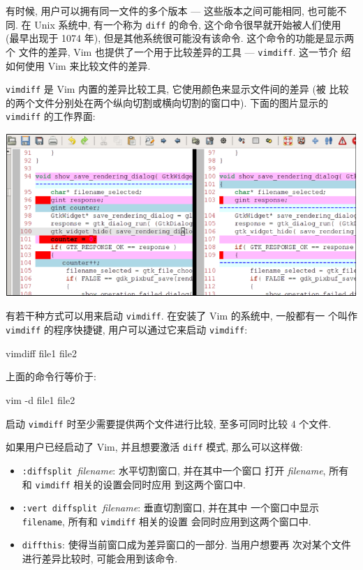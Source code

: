 有时候, 用户可以拥有同一文件的多个版本 --- 这些版本之间可能相同, 也可能不同.
在 Unix 系统中, 有一个称为 \texttt{diff} 的命令, 这个命令很早就开始被人们使用
(最早出现于 1074 年), 但是其他系统很可能没有该命令. 这个命令的功能是显示两个
文件的差异, Vim 也提供了一个用于比较差异的工具 --- \texttt{vimdiff}. 这一节介
绍如何使用 Vim 来比较文件的差异.

\texttt{vimdiff} 是 Vim 内置的差异比较工具, 它使用颜色来显示文件间的差异 (被
比较的两个文件分别处在两个纵向切割或横向切割的窗口中). 下面的图片显示的
\texttt{vimdiff} 的工作界面:
\begin{center}
    \includegraphics[scale=0.7]{./images/page112.png}
\end{center}

有若干种方式可以用来启动 \texttt{vimdiff}. 在安装了 Vim 的系统中, 一般都有一
个叫作 \texttt{vimdiff} 的程序快捷键, 用户可以通过它来启动 \texttt{vimdiff}:
\begin{vimcode}
vimdiff file1 file2
\end{vimcode}
上面的命令行等价于:
\begin{vimcode}
vim -d file1 file2
\end{vimcode}

启动 \texttt{vimdiff} 时至少需要提供两个文件进行比较, 至多可同时比较 4 个文件.

如果用户已经启动了 Vim, 并且想要激活 \texttt{diff} 模式, 那么可以这样做:
\begin{itemize}
    \item \texttt{:diffsplit }\textit{filename}: 水平切割窗口, 并在其中一个窗口
        打开 \textit{filename}, 所有和 \texttt{vimdiff} 相关的设置会同时应用
        到这两个窗口中.
    \item \texttt{:vert diffsplit }\textit{filename}: 垂直切割窗口, 并在其中
        一个窗口中显示 \texttt{filename}, 所有和 \texttt{vimdiff} 相关的设置
        会同时应用到这两个窗口中.
    \item \texttt{diffthis}: 使得当前窗口成为差异窗口的一部分. 当用户想要再
        次对某个文件进行差异比较时, 可能会用到该命令.
\end{itemize}
